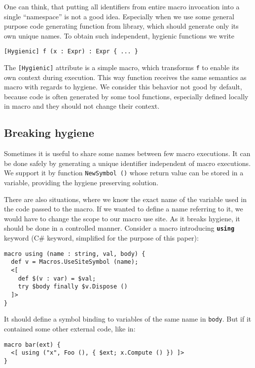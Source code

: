 \documentclass{llncs}
\newcommand{\kw}[1]{{\tt \bf #1}}
\begin{document}
One can think, that putting all identifiers from entire macro invocation into
a single ``namespace'' is not a good idea. Especially when we use some general 
purpose code generating function from library, which should generate only its 
own unique names. To obtain such independent, hygienic functions we write

\begin{verbatim}
[Hygienic] f (x : Expr) : Expr { ... }
\end{verbatim}

The \verb,[Hygienic], attribute is a simple macro, which transforms \verb,f, 
to enable its own context during execution. This way function receives the
same semantics as macro with regards to hygiene. We consider this behavior
not good by default, because code is often generated by some tool functions,
especially defined locally in macro and they should not change their context.

\subsection{Breaking hygiene}
Sometimes it is useful to share some names between few macro executions.
It can be done safely by generating a unique identifier independent of macro
executions. We support it by function \verb,NewSymbol (), whose return value
can be stored in a variable, providing the hygiene preserving solution.

There are also situations, where we know the exact name of the variable used in 
the code passed to the macro. If we wanted to define a name referring to it, we 
would have to change the scope to our macro use site. As it breaks hygiene, 
it should be done in a controlled manner. Consider a macro introducing \kw{using} 
keyword (C\# keyword, simplified for the purpose of this paper):

\begin{verbatim}
macro using (name : string, val, body) {
  def v = Macros.UseSiteSymbol (name);
  <[ 
    def $(v : var) = $val;
    try $body finally $v.Dispose ()
  ]>
}
\end{verbatim}

It should define a symbol binding to variables of the same name in \verb,body,.
But if it contained some other external code, like in:

\begin{verbatim}
macro bar(ext) { 
  <[ using ("x", Foo (), { $ext; x.Compute () }) ]> 
}
\end{verbatim} %
\end{document}
